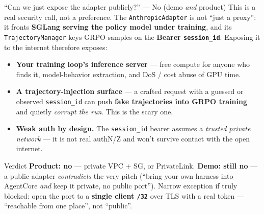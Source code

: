 \documentclass[aspectratio=169]{beamer}
\begin{document}
\begin{frame}{``Can we just expose the adapter publicly?'' --- No (demo \emph{and} product)}
  \footnotesize This is a real security call, not a preference. The \texttt{AnthropicAdapter} is not
  ``just a proxy'': it fronts \textbf{SGLang serving the policy model under training}, and its
  \texttt{TrajectoryManager} keys GRPO samples on the \textbf{Bearer \texttt{session\_id}}. Exposing
  it to the internet therefore exposes:
  \vspace{0.3em}
  \begin{itemize}\setlength\itemsep{0.45em}
    \item \textbf{Your training loop's inference server} --- free compute for anyone who finds it,
      model-behavior extraction, and DoS / cost abuse of GPU time.
    \item \textbf{A trajectory-injection surface} --- a crafted request with a guessed or observed
      \texttt{session\_id} can push \textbf{fake trajectories into GRPO training} and quietly
      \emph{corrupt the run}. This is the scary one.
    \item \textbf{Weak auth by design.} The \texttt{session\_id} bearer assumes a \emph{trusted
      private network} --- it is not real authN/Z and won't survive contact with the open internet.
  \end{itemize}
  \vspace{0.4em}
  \begin{block}{Verdict}
    \footnotesize \textbf{Product: no} --- private VPC + SG, or PrivateLink. \quad
    \textbf{Demo: still no} --- a public adapter \emph{contradicts} the very pitch (``bring your own
    harness into AgentCore \emph{and} keep it private, no public port''). Narrow exception if truly
    blocked: open the port to a \textbf{single client \texttt{/32}} over TLS with a real token ---
    ``reachable from one place'', not ``public''.
  \end{block}
\end{frame}
\end{document}
